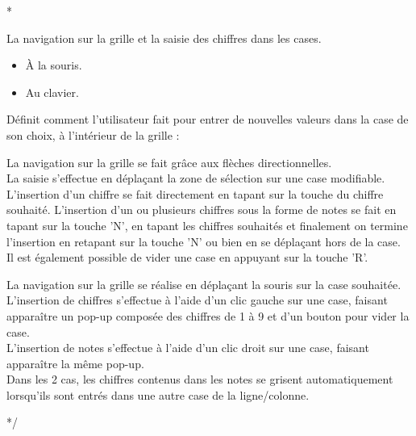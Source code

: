 \/*
{
    La navigation sur la grille et la saisie des chiffres dans les cases.
    \begin{itemize}
        \item À la souris.
        \item Au clavier.
    \end{itemize}
}
{
    Définit comment l'utilisateur fait pour entrer de nouvelles valeurs dans la case de son choix, à l'intérieur de la grille :
    \noexpand\begin{description}
        \noexpand\item[Clavier :]
            La navigation sur la grille se fait grâce aux flèches directionnelles.
            \\
            La saisie s'effectue en déplaçant la zone de sélection sur une case modifiable. L'insertion d'un chiffre se fait directement en tapant sur la touche du chiffre souhaité. L'insertion d'un ou plusieurs chiffres sous la forme de notes se fait en tapant sur la touche 'N', en tapant les chiffres souhaités et finalement on termine l'insertion en retapant sur la touche 'N' ou bien en se déplaçant hors de la case.
            \\
            Il est également possible de vider une case en appuyant sur la touche 'R'.
        \noexpand\item[Souris :]
            La navigation sur la grille se réalise en déplaçant la souris sur la case souhaitée.
            \\
            L'insertion de chiffres s'effectue à l'aide d'un clic gauche sur une case, faisant apparaître un pop-up composée des chiffres de 1 à 9 et d'un bouton pour vider la case.
            \\
            L'insertion de notes s'effectue à l'aide d'un clic droit sur une case, faisant apparaître la même pop-up. 
            \\
            Dans les 2 cas, les chiffres contenus dans les notes se grisent automatiquement lorsqu'ils sont entrés dans une autre case de la ligne/colonne.
    \noexpand\end{description}
}
*/